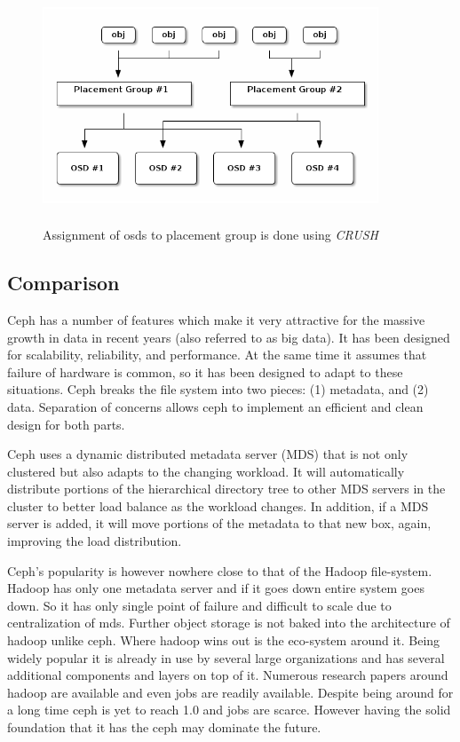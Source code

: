 \documentclass[a4paper,10pt]{article}
\begin{document}
\begin{figure}[!htb]
\centering
\includegraphics[width=10cm,height=7cm]{images/crush}
\caption[Long caption]{Assignment of osds to placement group is done using \emph{CRUSH} }
\end{figure}


\subsection{Comparison}
    Ceph has a number of features which make it very attractive for the massive growth in data in recent years (also referred to as big data). It has been designed for scalability, reliability, and performance. At the same time it assumes that failure of hardware is common, so it has been designed to adapt to these situations. Ceph breaks the file system into two pieces: (1) metadata, and (2) data. Separation of concerns allows ceph to implement an efficient and clean design for both parts.\cite{lwn}

    Ceph uses a dynamic distributed metadata server (MDS) that is not only clustered but also adapts to the changing workload. It will automatically distribute portions of the hierarchical directory tree to other MDS servers in the cluster to better load balance as the workload changes. In addition, if a MDS server is added, it will move portions of the metadata to that new box, again, improving the load distribution.
    
    Ceph's popularity is however nowhere close to that of the Hadoop file-system. Hadoop has only one metadata server and if it goes down entire system goes down. So it has only single point of failure and difficult to scale due to centralization of mds. Further object storage is not baked into the architecture of hadoop unlike ceph. Where hadoop wins out is the eco-system around it. Being widely popular it is already in use by several large organizations and has several additional components and layers on top of it. Numerous research papers around hadoop are available and even jobs are readily available. Despite being around for a long time ceph is yet to reach 1.0 and jobs are scarce. However having the solid foundation that it has the ceph may dominate the future.
\end{document}
